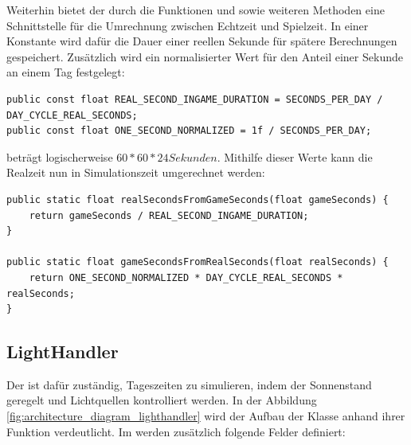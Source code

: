 Weiterhin bietet der  durch die Funktionen  und  sowie weiteren Methoden eine Schnittstelle für die Umrechnung zwischen Echtzeit und Spielzeit. In einer Konstante wird dafür die Dauer einer reellen Sekunde für spätere Berechnungen gespeichert. Zusätzlich wird ein normalisierter Wert für den Anteil einer Sekunde an einem Tag festgelegt:

\begin{minipage}{\linewidth}
\begin{lstlisting}[linewidth=16.4cm, label=lst:village_timecontroller_seconds_constants, caption=Berechnung der Dauer einer Sekunde in Simulationszeit, xleftmargin=1cm]
public const float REAL_SECOND_INGAME_DURATION = SECONDS_PER_DAY / DAY_CYCLE_REAL_SECONDS;
public const float ONE_SECOND_NORMALIZED = 1f / SECONDS_PER_DAY;
\end{lstlisting}
\end{minipage}

 beträgt logischerweise $ 60 * 60 * 24 Sekunden $. Mithilfe dieser Werte kann die Realzeit nun in Simulationszeit umgerechnet werden:

\begin{minipage}{\linewidth}
\begin{lstlisting}[linewidth=16.4cm, label=lst:village_timecontroller_time_calculation, caption=Umrechnung von Simulationszeit und Realzeit, xleftmargin=1cm]
public static float realSecondsFromGameSeconds(float gameSeconds) {
    return gameSeconds / REAL_SECOND_INGAME_DURATION;
}

public static float gameSecondsFromRealSeconds(float realSeconds) {
    return ONE_SECOND_NORMALIZED * DAY_CYCLE_REAL_SECONDS * realSeconds;
}
\end{lstlisting}
\end{minipage}



\subsection{LightHandler}
Der  ist dafür zuständig, Tageszeiten zu simulieren, indem der Sonnenstand geregelt und Lichtquellen kontrolliert werden. In der Abbildung \ref{fig:architecture_diagram_lighthandler} wird der Aufbau der Klasse anhand ihrer Funktion verdeutlicht. 
Im  werden zusätzlich folgende Felder definiert:

